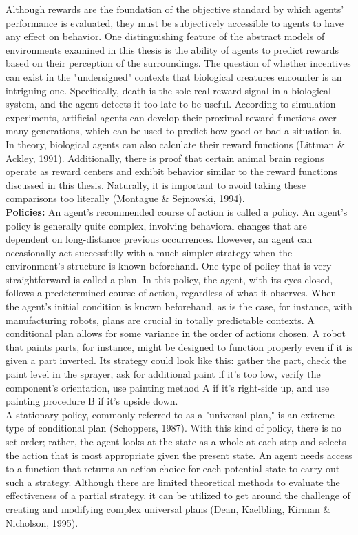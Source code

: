 \documentclass[a4paper,11pt,onecolumn]{article}
\begin{document}
Although rewards are the foundation of the objective standard by which agents' performance is evaluated, they must be subjectively accessible to agents to have any effect on behavior. One distinguishing feature of the abstract models of environments examined in this thesis is the ability of agents to predict rewards based on their perception of the surroundings. The question of whether incentives can exist in the "undersigned" contexts that biological creatures encounter is an intriguing one.  Specifically, death is the sole real reward signal in a biological system, and the agent detects it too late to be useful. According to simulation experiments, artificial agents can develop their proximal reward functions over many generations, which can be used to predict how good or bad a situation is. In theory, biological agents can also calculate their reward functions (Littman & Ackley, 1991). Additionally, there is proof that certain animal brain regions operate as reward centers and exhibit behavior similar to the reward functions discussed in this thesis. Naturally, it is important to avoid taking these comparisons too literally (Montague & Sejnowski, 1994).\\
\textbf{Policies:} An agent's recommended course of action is called a policy. An agent's policy is generally quite complex, involving behavioral changes that are dependent on long-distance previous occurrences. However, an agent can occasionally act successfully with a much simpler strategy when the environment's structure is known beforehand. One type of policy that is very straightforward is called a plan. In this policy, the agent, with its eyes closed, follows a predetermined course of action, regardless of what it observes. When the agent's initial condition is known beforehand, as is the case, for instance, with manufacturing robots, plans are crucial in totally predictable contexts. A conditional plan allows for some variance in the order of actions chosen. A robot that paints parts, for instance, might be designed to function properly even if it is given a part inverted. Its strategy could look like this: gather the part, check the paint level in the sprayer, ask for additional paint if it's too low, verify the component's orientation, use painting method A if it's right-side up, and use painting procedure B if it's upside down.\\
A stationary policy, commonly referred to as a "universal plan," is an extreme type of conditional plan (Schoppers, 1987). With this kind of policy, there is no set order; rather, the agent looks at the state as a whole at each step and selects the action that is most appropriate given the present state. An agent needs access to a function that returns an action choice for each potential state to carry out such a strategy. Although there are limited theoretical methods to evaluate the effectiveness of a partial strategy, it can be utilized to get around the challenge of creating and modifying complex universal plans (Dean, Kaelbling, Kirman & Nicholson, 1995).\\
\end{document}
